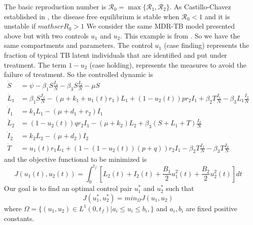    The basic reproduction number is 
    $
    	\mathscr{R}_{0} =  \max\lbrace \mathscr{R}_{1},\mathscr{R}_{2} 
    \rbrace
    $.
    As Castillo-Chavez established in \cite{Castillo-Chavez1997}, the disease free equilibrium is stable when $\mathscr{R}_{0} < 1$ and it is unstable if $mathscr{R}_{0} > 1$
    \noindent We consider the same MDR-TB model presented above but with two controls $u_1$ and $u_2$. This example is from {\citep{articleLenhart}}. So we have the same compartments and parameters. The control $u_1$ (case finding) represents the fraction of typical TB latent individuals that are identified and put under treatment. The term $1 - u_2$ (case holding), represents the measures to avoid the failure of treatment.  So the controlled dynamic is 
    \begin{align*}
    	\dot{S}	&= 
        	\psi -\beta_{1} S \frac{I_1}{N} - \beta_{3}S\frac{I_2}{N} - 
            \mu S 
            \\
        \dot{L}_1 &= 
        	\beta_{1}S \frac{I_1}{N} - (\mu + k_1 + u_1(t)r_1)L_{1} + 
            (1 - u_2(t))pr_2 I_1 + \beta_{2} T \frac{I_1}{N} -
            \beta_{3} L_{1}\frac{I_2}{N}  
            \\
        \dot{I}_1 &=  
        	k_1 L_{1} - (\mu + d_1 + r_2)I_1  
            \\
        \dot{L}_2 &=  
        	(1 - u_2(t))q r_2 I_1 - (\mu + k_2)L_2 + \beta_{3}(S + L_1 + 
            T)\frac{I_2}{N}  
            \\
        \dot{I}_2 &=  
        	k_2 L_2 - (\mu + d_2)I_2  
            \\
        \dot{T} &=  
        	u_1(t)r_1 L_{1} + (1-(1-u_2(t))(p+q))r_2 I_1 - \beta_{2} T \frac{I_1}{N} - 
            \beta_{3}T\frac{I_2}{N}  
    \end{align*}
    and the objective functional to be minimized is 
    $$
        J(u_1(t),u_2(t)) = \int_{0}^{t_f} %
            \left[%
                L_2(t) + I_2(t) + \dfrac{B_1}{2} u_{1}^{2}(t) + \dfrac{B_2}{2} u_{2}^{2}(t)%
            \right] dt
    $$
    Our goal is to find an optimal control pair $u_{1}^{*}$ and $u_{2}^{*}$ such that
    $$
        J(u_{1}^{*},u_{2}^{*}) = min_{\Omega}J(u_1,u_2)
    $$
    where $\Omega = \{(u_1,u_2) \in L^{1}(0, t_{f}) | a_i \leq u_i \leq b_i, \}$ and
    $a_i , b_i$ are fixed positive constants. 
    
